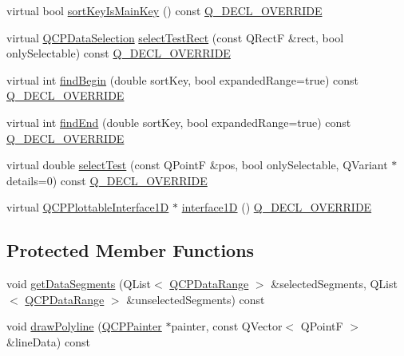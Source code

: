 \begin{DoxyCompactItemize}
\item 
virtual bool \hyperlink{class_q_c_p_abstract_plottable1_d_afe0d56e39cc076032922f059b304c092}{sort\+Key\+Is\+Main\+Key} () const \hyperlink{qcustomplot_8h_a42cc5eaeb25b85f8b52d2a4b94c56f55}{Q\+\_\+\+D\+E\+C\+L\+\_\+\+O\+V\+E\+R\+R\+I\+DE}
\item 
virtual \hyperlink{class_q_c_p_data_selection}{Q\+C\+P\+Data\+Selection} \hyperlink{class_q_c_p_abstract_plottable1_d_a22377bf6e57ab7eedbc9e489250c6ded}{select\+Test\+Rect} (const Q\+RectF \&rect, bool only\+Selectable) const \hyperlink{qcustomplot_8h_a42cc5eaeb25b85f8b52d2a4b94c56f55}{Q\+\_\+\+D\+E\+C\+L\+\_\+\+O\+V\+E\+R\+R\+I\+DE}
\item 
virtual int \hyperlink{class_q_c_p_abstract_plottable1_d_ad0b46d25cde3d035b180fb8f10c056e6}{find\+Begin} (double sort\+Key, bool expanded\+Range=true) const \hyperlink{qcustomplot_8h_a42cc5eaeb25b85f8b52d2a4b94c56f55}{Q\+\_\+\+D\+E\+C\+L\+\_\+\+O\+V\+E\+R\+R\+I\+DE}
\item 
virtual int \hyperlink{class_q_c_p_abstract_plottable1_d_a6e3ba20c9160d7361e58070390d10b1a}{find\+End} (double sort\+Key, bool expanded\+Range=true) const \hyperlink{qcustomplot_8h_a42cc5eaeb25b85f8b52d2a4b94c56f55}{Q\+\_\+\+D\+E\+C\+L\+\_\+\+O\+V\+E\+R\+R\+I\+DE}
\item 
virtual double \hyperlink{class_q_c_p_abstract_plottable1_d_a4611b43bcb6441b2154eb4f4e0a33db2}{select\+Test} (const Q\+PointF \&pos, bool only\+Selectable, Q\+Variant $\ast$details=0) const \hyperlink{qcustomplot_8h_a42cc5eaeb25b85f8b52d2a4b94c56f55}{Q\+\_\+\+D\+E\+C\+L\+\_\+\+O\+V\+E\+R\+R\+I\+DE}
\item 
virtual \hyperlink{class_q_c_p_plottable_interface1_d}{Q\+C\+P\+Plottable\+Interface1D} $\ast$ \hyperlink{class_q_c_p_abstract_plottable1_d_ac58fb47bfe330f6931ed8e64326387d7}{interface1D} () \hyperlink{qcustomplot_8h_a42cc5eaeb25b85f8b52d2a4b94c56f55}{Q\+\_\+\+D\+E\+C\+L\+\_\+\+O\+V\+E\+R\+R\+I\+DE}
\end{DoxyCompactItemize}
\subsection*{Protected Member Functions}
\begin{DoxyCompactItemize}
\item 
void \hyperlink{class_q_c_p_abstract_plottable1_d_ae890e62ce403c54f575c73b9529f1af8}{get\+Data\+Segments} (Q\+List$<$ \hyperlink{class_q_c_p_data_range}{Q\+C\+P\+Data\+Range} $>$ \&selected\+Segments, Q\+List$<$ \hyperlink{class_q_c_p_data_range}{Q\+C\+P\+Data\+Range} $>$ \&unselected\+Segments) const
\item 
void \hyperlink{class_q_c_p_abstract_plottable1_d_a7adc6c3cccebb5341f11e0c2b7d54206}{draw\+Polyline} (\hyperlink{class_q_c_p_painter}{Q\+C\+P\+Painter} $\ast$painter, const Q\+Vector$<$ Q\+PointF $>$ \&line\+Data) const
\end{DoxyCompactItemize}
